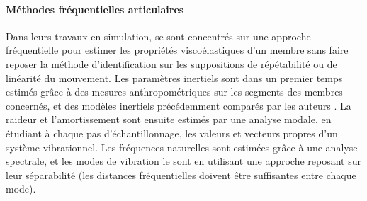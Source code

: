 \paragraph{Méthodes fréquentielles articulaires}

Dans leurs travaux en simulation, \textcite{piovesan_measuring_2012} se sont concentrés sur une approche fréquentielle pour estimer les propriétés viscoélastiques d'un membre sans faire reposer la méthode d'identification sur les suppositions de répétabilité ou de linéarité du mouvement. Les paramètres inertiels sont dans un premier temps estimés grâce à des mesures anthropométriques sur les segments des membres concernés, et des modèles inertiels précédemment comparés par les auteurs \parencite{piovesan_comparative_2011}. La raideur et l'amortissement sont ensuite estimés par une analyse modale, en étudiant à chaque pas d'échantillonnage, les valeurs et vecteurs propres d'un système vibrationnel. Les fréquences naturelles sont estimées grâce à une analyse spectrale, et les modes de vibration le sont en utilisant une approche reposant sur leur séparabilité (les distances fréquentielles doivent être suffisantes entre chaque mode).



